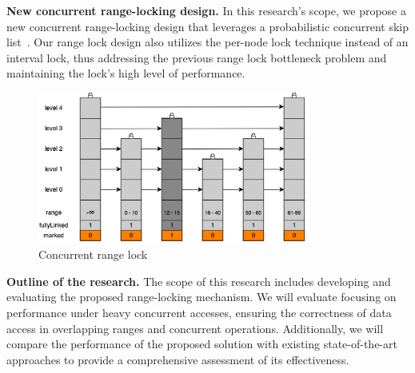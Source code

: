 \newpage

\textbf{New concurrent range-locking design.} In this research's scope, we propose a new concurrent range-locking design that leverages a probabilistic concurrent skip list~\parencite{herlihy2006provably, herlihy2020art}. Our range lock design also utilizes the per-node lock technique instead of an interval lock, thus addressing the previous range lock bottleneck problem and maintaining the lock's high level of performance.

\begin{figure}[h]
    \centering
    \includegraphics[width=0.8\textwidth]{./figures/concurrent_range_lock.png}
    \caption{Concurrent range lock}
    \label{fig:concurrent_range_lock}
\end{figure}

\textbf{Outline of the research.} The scope of this research includes developing and evaluating the proposed range-locking mechanism. We will evaluate focusing on performance under heavy concurrent accesses, ensuring the correctness of data access in overlapping ranges and concurrent operations. Additionally, we will compare the performance of the proposed solution with existing state-of-the-art approaches to provide a comprehensive assessment of its effectiveness.